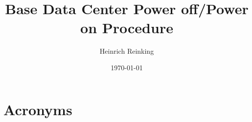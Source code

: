 \documentclass[PMO,authoryear,toc]{lsstdoc}
\title{Base Data Center Power off/Power on Procedure}
\author{%
Heinrich Reinking
}
\date{\today}
\begin{document}
\maketitle


\appendix
\renewcommand{\refname}{} %


\newpage
\section{Acronyms} \label{sec:acronyms}

\end{document}
